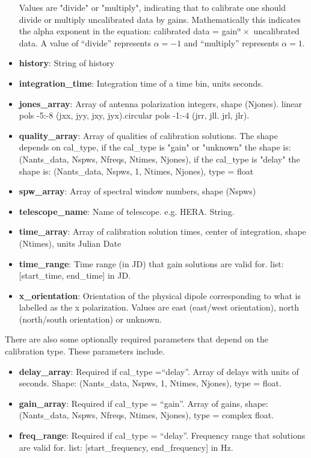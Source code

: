\documentclass[11pt, oneside]{article}   	%
\begin{document}
\begin{itemize}
{    Values are "divide" or "multiply", indicating that to calibrate one should divide or multiply
    uncalibrated data by gains. Mathematically this indicates the alpha exponent in the equation: 
    calibrated data = gain$^{\alpha} \times $ uncalibrated data. A value of
    ``divide'' represents $\alpha=-1$ and ``multiply'' represents $\alpha=1$.}
\item{\textbf{history}: String of history}
\item{\textbf{integration\_time}: Integration time of a time bin, units seconds.}
\item{\textbf{jones\_array}: Array of antenna polarization integers, shape
    (Njones). linear pols -5:-8 (jxx, jyy, jxy, jyx).circular pols -1:-4 (jrr,
    jll. jrl, jlr).}
\item{\textbf{quality\_array}: Array of qualities of calibration solutions. The
    shape depends on cal\_type, if the cal\_type is "gain" or "unknown" the shape is:
    (Nants\_data, Nspws, Nfreqs, Ntimes, Njones), if the cal\_type is "delay" the shape is: 
    (Nants\_data, Nspws, 1, Ntimes, Njones), type = float}
\item{\textbf{spw\_array}: Array of spectral window numbers, shape (Nspws)}
\item{\textbf{telescope\_name}: Name of telescope. e.g. HERA. String.}
\item{\textbf{time\_array}: Array of calibration solution times, center of integration, shape
    (Ntimes), units Julian Date}
\item{\textbf{time\_range}: Time range (in JD) that gain solutions are valid
    for. list: [start\_time, end\_time] in JD.}
\item{\textbf{x\_orientation}: Orientation of the physical dipole corresponding
    to what is labelled as the x polarization. Values are east (east/west
    orientation), north (north/south orientation) or unknown.}
\end{itemize}

There are also some optionally required parameters that depend on the
calibration type. These parameters include.
\begin{itemize}
\item{\textbf{delay\_array}: Required if cal\_type =``delay''. Array of delays with
    units of seconds. Shape: (Nants\_data, Nspws, 1, Ntimes, Njones), type = float.}
\item{\textbf{gain\_array}: Required if cal\_type = ``gain''. Array of gains, 
    shape: (Nants\_data, Nspws, Nfreqs, Ntimes, Njones), type = complex float.}
\item{\textbf{freq\_range}: Required if cal\_type = ``delay''. Frequency range that
   solutions are valid for. list: [start\_frequency, end\_frequency] in Hz.}
\end{itemize}
\end{document}
